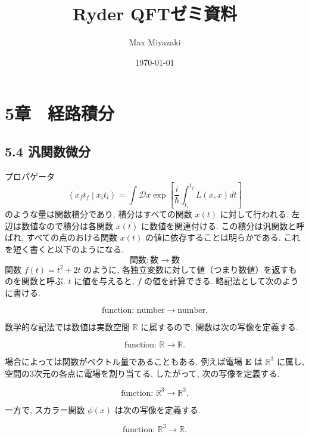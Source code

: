 \documentclass[a4paper,12pt]{article}
\title{Ryder QFTゼミ資料}
\date{\today}
\author{Max Miyazaki}
\newcommand{\braket}[2]{\left\langle #1\middle|#2\right\rangle}
\begin{document}
\maketitle
\section*{\textrm{5章　経路積分}}
\subsection*{\textrm{5.4 汎関数微分}}
プロパゲータ
\begin{equation*}
    \braket{x_f t_f}{x_i t_i} = \int \mathcal{D}x \exp\left[ \frac{i}{\hbar}\int_{t_i}^{t_f} L(x, \dot{x})dt \right]
\end{equation*}
のような量は関数積分であり, 積分はすべての関数 $x(t)$ に対して行われる. 左辺は数値なので積分は各関数 $x(t)$ に数値を関連付ける. この積分は汎関数と呼ばれ, すべての点のおける関数 $x(t)$ の値に依存することは明らかである. これを短く書くと以下のようになる.
\begin{equation*}
    \textrm{関数} : \textrm{数} \rightarrow \textrm{数}\tag{5.50}
\end{equation*}
関数 $ f(t) = t^2 + 2t $ のように, 各独立変数に対して値（つまり数値）を返すものを関数と呼ぶ. $ t $ に値を与えると, $ f $ の値を計算できる. 略記法として次のように書ける.

\begin{equation*}
\text{function: number} \rightarrow \text{number}. \tag{5.51}
\end{equation*}

数学的な記法では数値は実数空間 $ \mathbb{R} $ に属するので, 関数は次の写像を定義する.

\begin{equation*}
\text{function: } \mathbb{R} \rightarrow \mathbb{R}. \tag{5.52}
\end{equation*}

場合によっては関数がベクトル量であることもある. 例えば電場 $ \mathbf{E} $ は $ \mathbb{R}^3 $ に属し, 空間の3次元の各点に電場を割り当てる. したがって, 次の写像を定義する.

\begin{equation*}
\text{function: } \mathbb{R}^3 \rightarrow \mathbb{R}^3. 
\end{equation*}

一方で, スカラー関数 $ \phi(x) $ は次の写像を定義する.

\begin{equation*}
\text{function: } \mathbb{R}^3 \rightarrow \mathbb{R}.
\end{equation*}
\end{document}
